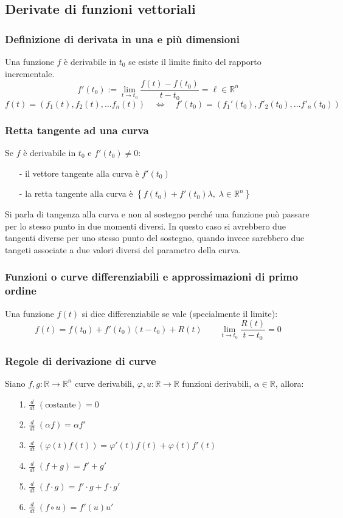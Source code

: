 \documentclass[a4paper]{article}
\newcommand\R{\mathbb{R}}     %
\newcommand\Rn{\mathbb{R}^n}  %
\newcommand\dt{\frac{d}{dt}}  %
\begin{document}
\subsection{Derivate di funzioni vettoriali}
\subsubsection*{Definizione di derivata in una e più dimensioni}
Una funzione \(f\) è derivabile in \(t_0\) se esiste il limite finito del rapporto incrementale.
\[f'(t_0) := \lim_{t \to t_0} \frac{f(t)-f(t_0)}{t-t_0} = \ell \in \Rn\]
\[f(t) = \left(f_1(t), f_2(t), \dots f_n(t) \right) \quad \Leftrightarrow \quad f'(t_0) = \left( f_1'(t_0), f'_2(t_0), \dots f'_n(t_0)\right)\]

\subsubsection*{Retta tangente ad una curva}
Se \(f\) è derivabile in \(t_0\) e \(f'(t_0) \neq 0\):
\begin{itemize}[topsep=3pt, itemsep=0pt]
	\item[-] il vettore tangente alla curva è \(f'(t_0)\)
	\item[-] la retta tangente alla curva è \(\left\{ f(t_0) + f'(t_0) \lambda, \; \lambda \in \Rn \right\}\)
\end{itemize}
Si parla di tangenza alla curva e non al sostegno perché una funzione può passare per lo stesso punto in due momenti diversi. In
questo caso si avrebbero due tangenti diverse per uno stesso punto del sostegno, quando invece sarebbero due tangeti associate a
due valori diversi del parametro della curva.

\subsubsection*{Funzioni o curve differenziabili e approssimazioni di primo ordine}
Una funzione \(f(t)\) si dice differenziabile se vale (specialmente il limite):
\[f(t) = f(t_0) + f'(t_0) (t-t_0) + R(t) \qquad \lim_{t \to t_0} \frac{R(t)}{t-t_0} = 0\]

\subsubsection*{Regole di derivazione di curve}
Siano \(f,g : \R \to \Rn\) curve derivabili, \(\varphi,u : \R \to \R\) funzioni derivabili, \(\alpha \in \R\), allora:
\begin{itemize}[topsep=3pt, itemsep=0pt]
	\item[1.] \(\dt \; \left(\text{costante}\right) = 0\)
	\item[2.] \(\dt \; \left(\alpha f\right) = \alpha f'\)
	\item[3.] \(\dt \; \left(\varphi(t)f(t)\right) = \varphi'(t)f(t) + \varphi(t)f'(t)\)
	\item[4.] \(\dt \; \left(f + g\right) = f' + g'\)
	\item[5.] \(\dt \; \left(f \cdot g\right) = f' \cdot g + f \cdot g'\)
	\item[6.] \(\dt \; \left(f \circ u\right) = f'(u)u'\)
\end{itemize}
\end{document}
